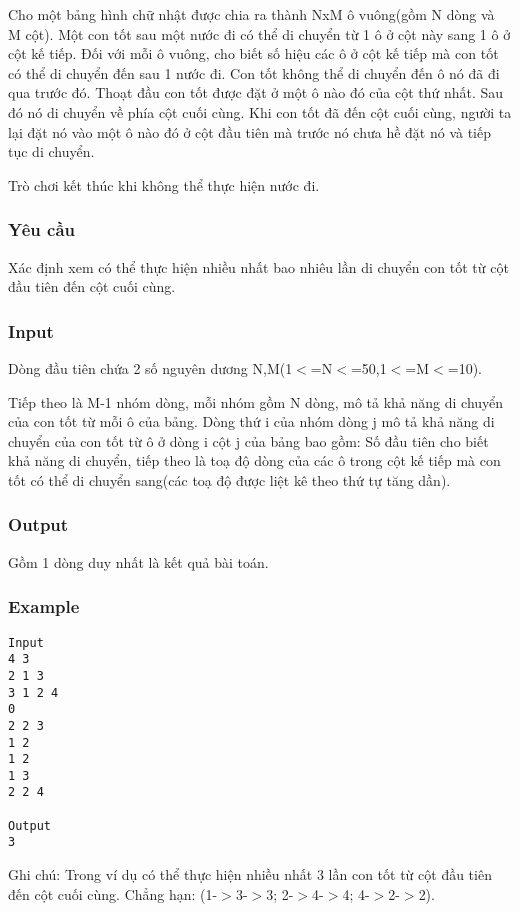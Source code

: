 



   Cho một bảng hình chữ nhật được chia ra thành NxM ô vuông(gồm N dòng và M cột). Một con tốt sau một nước đi có thể di chuyển từ 1 ô ở cột này sang 1 ô ở cột kế tiếp. Đối với mỗi ô vuông, cho biết số hiệu các ô ở cột kế tiếp mà con tốt có thể di chuyển đến sau 1 nước đi. Con tốt không thể di chuyển đến ô nó đã đi qua trước đó. Thoạt đầu con tốt được đặt ở một ô nào đó của cột thứ nhất. Sau đó nó di chuyển về phía cột cuối cùng. Khi con tốt đã đến cột cuối cùng, người ta lại đặt nó vào một ô nào đó ở cột đầu tiên mà trước nó chưa hề đặt nó và tiếp tục di chuyển.  

   Trò chơi kết thúc khi không thể thực hiện nước đi.  

\subsubsection{   Yêu cầu  }

   Xác định xem có thể thực hiện nhiều nhất bao nhiêu lần di chuyển con tốt từ cột đầu tiên đến cột cuối cùng.  

\subsubsection{   Input  }

   Dòng đầu tiên chứa 2 số nguyên dương N,M(1$<$=N$<$=50,1$<$=M$<$=10).  

   Tiếp theo là M-1 nhóm dòng, mỗi nhóm gồm N dòng, mô tả khả năng di chuyển của con tốt từ mỗi ô của bảng. Dòng thứ i của nhóm dòng j mô tả khả năng di chuyển của con tốt từ ô ở dòng i cột j của bảng bao gồm: Số đầu tiên cho biết khả năng di chuyển, tiếp theo là toạ độ dòng của các ô trong cột kế tiếp mà con tốt có thể di chuyển sang(các toạ độ được liệt kê theo thứ tự tăng dần).  

\subsubsection{   Output  }

   Gồm 1 dòng duy nhất là kết quả bài toán.  

\subsubsection{   Example  }
\begin{verbatim}
Input
4 3 
2 1 3 
3 1 2 4
0
2 2 3 
1 2 
1 2 
1 3 
2 2 4 

Output
3
\end{verbatim}

   Ghi chú: Trong ví dụ có thể thực hiện nhiều nhất 3 lần con tốt từ cột đầu tiên đến cột cuối cùng. Chẳng hạn: (1-$>$3-$>$3; 2-$>$4-$>$4; 4-$>$2-$>$2).  